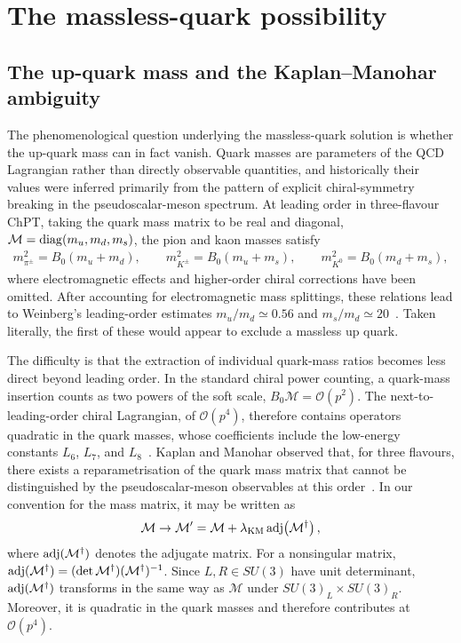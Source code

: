 \documentclass[review]{elsarticle}
\numberwithin{equation}{section}
\numberwithin{table}{section}
\numberwithin{figure}{section}
\def\M{\mathcal{M}}
\begin{document}
\section{The massless-quark possibility}
\label{sec:massless-quark-possibility}

\subsection{The up-quark mass and the Kaplan--Manohar ambiguity}
\label{sec:Kaplan-Manohar-ambiguity}

The phenomenological question underlying the massless-quark solution is whether the up-quark mass can in fact vanish. Quark masses are parameters of the QCD Lagrangian rather than directly observable quantities, and historically their values were inferred primarily from the pattern of explicit chiral-symmetry breaking in the pseudoscalar-meson spectrum. At leading order in three-flavour ChPT, taking the quark mass matrix to be real and diagonal, $\M={\rm diag}(m_u,m_d,m_s)$, the pion and kaon masses satisfy~\cite{Gasser:1984gg}
\begin{align}
    m_{\pi^{\pm}}^2 = B_0(m_u+m_d),\qquad
    m_{K^{\pm}}^2 = B_0(m_u+m_s),\qquad
    m_{K^0}^2 = B_0(m_d+m_s),
    \label{eq:LO-meson-masses-quark-masses}
\end{align}
where electromagnetic effects and higher-order chiral corrections have been omitted. After accounting for electromagnetic mass splittings, these relations lead to Weinberg's leading-order estimates $m_u/m_d\simeq0.56$ and $m_s/m_d\simeq20$~\cite{Weinberg:1977hb}. Taken literally, the first of these would appear to exclude a massless up quark.

The difficulty is that the extraction of individual quark-mass ratios becomes less direct beyond leading order. In the standard chiral power counting, a quark-mass insertion counts as two powers of the soft scale, $B_0\M=\mathcal{O}(p^2)$. The next-to-leading-order chiral Lagrangian, of $\mathcal{O}(p^4)$, therefore contains operators quadratic in the quark masses, whose coefficients include the low-energy constants $L_6$, $L_7$, and $L_8$~\cite{Gasser:1984gg}. Kaplan and Manohar observed that, for three flavours, there exists a reparametrisation of the quark mass matrix that cannot be distinguished by the pseudoscalar-meson observables at this order~\cite{Kaplan:1986ru}. In our convention for the mass matrix, it may be written as
\begin{align}
    \M \rightarrow \M' = \M + \lambda_{\rm KM}\,{\rm adj}\!\left(\M^\dagger\right),
    \label{eq:Kaplan-Manohar-transformation}
\end{align}
where ${\rm adj}(\M^\dagger)$ denotes the adjugate matrix. For a nonsingular matrix, ${\rm adj}(\M^\dagger)=(\det\M^\dagger)(\M^\dagger)^{-1}$. Since $L,R\in SU(3)$ have unit determinant, ${\rm adj}(\M^\dagger)$ transforms in the same way as $\M$ under $SU(3)_L\times SU(3)_R$. Moreover, it is quadratic in the quark masses and therefore contributes at $\mathcal{O}(p^4)$.
\end{document}
